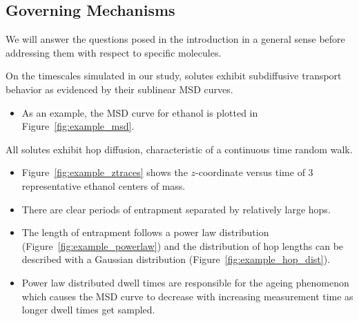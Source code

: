 \documentclass{article}
\begin{document}
  \subsection*{Governing Mechanisms}\label{section:mechanism_overview}  
  
  We will answer the questions posed in the introduction in a general 
  sense before addressing them with respect to specific molecules. 
  
  On the timescales simulated in our study, solutes exhibit subdiffusive
  transport behavior as evidenced by their sublinear MSD curves. 
  \begin{itemize}  
	\item As an example, the MSD curve for ethanol is plotted in 
	Figure~\ref{fig:example_msd}.
  \end{itemize}
  
  \noindent All solutes exhibit hop diffusion, characteristic of a continuous time random walk.
  \begin{itemize}
  	\item Figure~\ref{fig:example_ztraces} shows the $z$-coordinate versus time of
  	3 representative ethanol centers of mass.
  	\item There are clear periods of entrapment separated by relatively large hops.
  	\item The length of entrapment follows a power law distribution 
  	(Figure~\ref{fig:example_powerlaw}) and the distribution of hop lengths can be 
  	described with a Gaussian distribution (Figure~\ref{fig:example_hop_dist}).
  	\item Power law distributed dwell times are responsible for the ageing phenomenon
  	which causes the MSD curve to decrease with increasing measurement time as longer
  	dwell times get sampled.
  \end{itemize}
  
\end{document}
